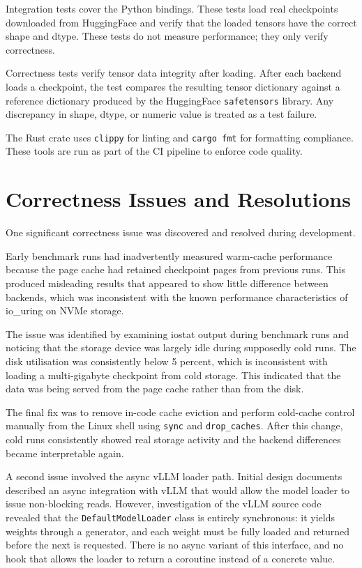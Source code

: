 Integration tests cover the Python bindings. These tests load real checkpoints downloaded from HuggingFace and verify that the loaded tensors have the correct shape and dtype. These tests do not measure performance; they only verify correctness.

Correctness tests verify tensor data integrity after loading. After each backend loads a checkpoint, the test compares the resulting tensor dictionary against a reference dictionary produced by the HuggingFace \texttt{safetensors} library. Any discrepancy in shape, dtype, or numeric value is treated as a test failure.

The Rust crate uses \texttt{clippy} for linting and \texttt{cargo fmt} for formatting compliance. These tools are run as part of the CI pipeline to enforce code quality.

\section{Correctness Issues and Resolutions}

One significant correctness issue was discovered and resolved during development.

Early benchmark runs had inadvertently measured warm-cache performance because the page cache had retained checkpoint pages from previous runs. This produced misleading results that appeared to show little difference between backends, which was inconsistent with the known performance characteristics of io\_uring on NVMe storage.

The issue was identified by examining iostat output during benchmark runs and noticing that the storage device was largely idle during supposedly cold runs. The disk utilisation was consistently below 5 percent, which is inconsistent with loading a multi-gigabyte checkpoint from cold storage. This indicated that the data was being served from the page cache rather than from the disk.

The final fix was to remove in-code cache eviction and perform cold-cache control manually from the Linux shell using \texttt{sync} and \texttt{drop\_caches}. After this change, cold runs consistently showed real storage activity and the backend differences became interpretable again.

A second issue involved the async vLLM loader path. Initial design documents described an async integration with vLLM that would allow the model loader to issue non-blocking reads. However, investigation of the vLLM source code revealed that the \texttt{DefaultModelLoader} class is entirely synchronous: it yields weights through a generator, and each weight must be fully loaded and returned before the next is requested. There is no async variant of this interface, and no hook that allows the loader to return a coroutine instead of a concrete value.

